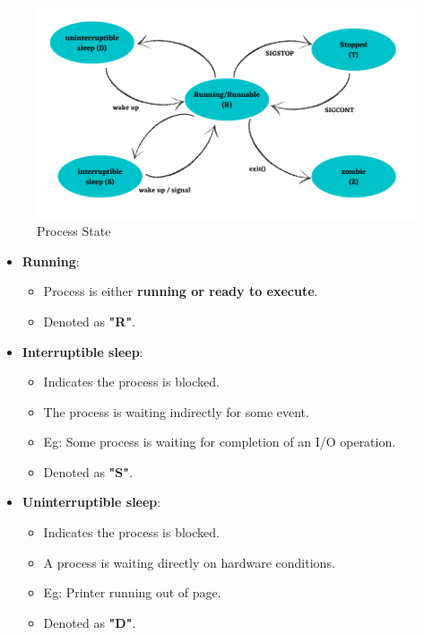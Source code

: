 \setlength{\columnsep}{3pt}
\begin{flushleft}
	
	\begin{figure}[h!]
		\centering
		\includegraphics[scale=0.5]{content/chapter12/images/state_process.png}
		\caption{Process State}
		\label{fig:process_state}
	\end{figure}
	
	\begin{itemize}
		\item \textbf{Running}: 
		\begin{itemize}
			\item Process is either \textbf{running or ready to execute}.
			\item Denoted as \textbf{"R"}.
		\end{itemize}

		
		\bigskip
		\item \textbf{Interruptible sleep}: 
		\begin{itemize}
			\item Indicates the process is blocked.
			\item The process is waiting indirectly for some event.
			\item Eg: Some process is waiting for completion of an I/O operation.
			\item Denoted as \textbf{"S"}.
		\end{itemize}
		
		
		\bigskip
		\item \textbf{Uninterruptible sleep}: 
		\begin{itemize}
			\item Indicates the process is blocked.
			\item A process is waiting directly on hardware conditions.
			\item Eg: Printer running out of page.
			\item Denoted as \textbf{"D"}.
		\end{itemize} 
		

\end{itemize}
\end{flushleft}
